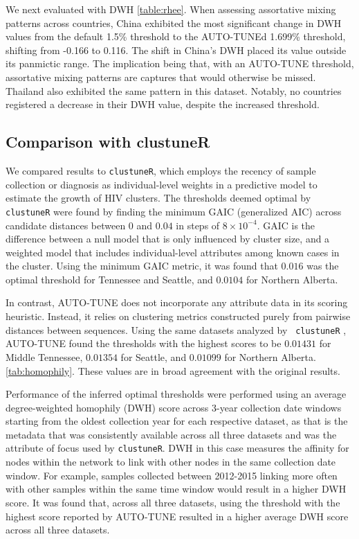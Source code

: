 \documentclass[utf8]{FrontiersinHarvard} %
\newcommand{\TODO}[1]{{\color{red}{#1}}}
\begin{document}
We next evaluated \citep{rhee_national_2019} with DWH \ref{table:rhee}. When
assessing assortative mixing patterns across countries, China exhibited the
most significant change in DWH values from the default 1.5\% threshold to the
AUTO-TUNEd 1.699\% threshold, shifting from -0.166 to 0.116. The shift in
China's DWH placed its value outside its panmictic range. The implication being
that, with an AUTO-TUNE threshold, assortative mixing patterns are captures
that would otherwise be missed. Thailand also exhibited the same pattern in
this dataset. Notably, no countries registered a decrease in their DWH value,
despite the increased threshold.
\label{fig:scoreAbove2}



\subsection{Comparison with clustuneR}

We compared results to {\tt clustuneR}, which employs the recency of sample
collection or diagnosis as individual-level weights in a predictive model to
estimate the growth of HIV clusters. The thresholds deemed optimal by {\tt
		clustuneR} were found by finding the minimum GAIC (generalized AIC) across
candidate distances between $0$ and $0.04$ in steps of $8 \times 10^{-4}$. GAIC
is the difference between a null model that is only influenced by cluster size,
and a weighted model that includes individual-level attributes among known
cases in the cluster. Using the minimum GAIC metric, it was found that $0.016$
was the optimal threshold for Tennessee and Seattle, and $0.0104$ for Northern
Alberta.

In contrast, AUTO-TUNE does not incorporate any attribute data in its scoring
heuristic. Instead, it relies on clustering metrics constructed purely from
pairwise distances between sequences. Using the same datasets analyzed by {\tt
		clustuneR} \citep{chato_public_2020}, AUTO-TUNE found the thresholds with the
highest scores to be $0.01431$ for Middle Tennessee, $0.01354$ for Seattle, and
$0.01099$ for Northern Alberta. \autoref{tab:homophily}. These values are in
broad agreement with the original results.

\TODO{discuss how our thresholds perform vs the published thresholds; look at the GAIC plots}

Performance of the inferred optimal thresholds were performed using an average
degree-weighted homophily (DWH) score across 3-year collection date windows
starting from the oldest collection year for each respective dataset, as that
is the metadata that was consistently available across all three datasets and
was the attribute of focus used by {\tt clustuneR}. DWH in this case measures
the affinity for nodes within the network to link with other nodes in the same
collection date window. For example, samples collected between 2012-2015
linking more often with other samples within the same time window would result
in a higher DWH score. It was found that, across all three datasets, using the
threshold with the highest score reported by AUTO-TUNE resulted in a higher
average DWH score across all three datasets. \TODO{compared to what?}
\end{document}
